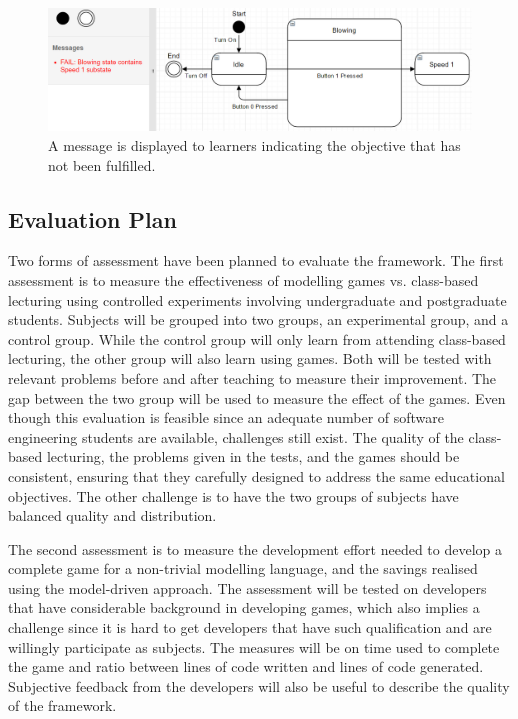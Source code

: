 \documentclass[12pt, a4paper]{report} \usepackage[titletoc]{appendix}
\begin{document}
\begin{figure}[t!]
\centering
\includegraphics[width=12cm]{example-fail-messages}
\caption{A message is displayed to learners indicating the objective that has not been fulfilled.}
\label{example-fail-messages}
\end{figure}  

\subsection{Evaluation Plan}
\label{Evaluation Plan}
Two forms of assessment have been planned to evaluate the framework. The first assessment is to measure the effectiveness of modelling games vs. class-based lecturing using controlled experiments involving undergraduate and postgraduate students. Subjects will be grouped into two groups, an experimental group, and a control group. While the control group will only learn from attending class-based lecturing, the other group will also learn using games. Both will be tested with relevant problems before and after teaching to measure their improvement. The gap between the two group will be used to measure the effect of the games. Even though this evaluation is feasible since an adequate number of software engineering students are available, challenges still exist. The quality of the class-based lecturing, the problems given in the tests, and the games should be consistent, ensuring that they carefully designed to address the same educational objectives. The other challenge is to have the two groups of subjects have balanced quality and distribution. 
  
The second assessment is to measure the development effort needed to develop a complete game for a non-trivial modelling language, and the savings realised using the model-driven approach. The assessment will be tested on developers that have considerable background in developing games, which also implies a challenge since it is hard to get developers that have such qualification and are willingly participate as subjects. The measures will be on time used to complete the game and ratio between lines of code written and lines of code generated. Subjective feedback from the developers will also be useful to describe the quality of the framework. 
\end{document}
